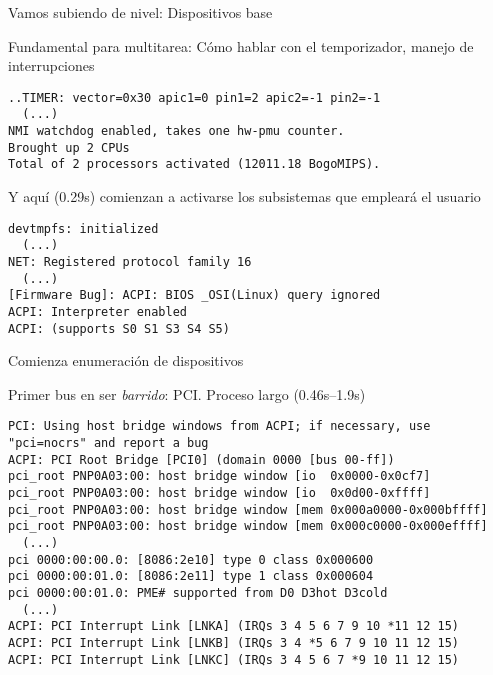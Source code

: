 \documentclass[presentation]{beamer}
\begin{document}
\begin{frame}[label={sec:org59625fe},fragile]{Vamos subiendo de nivel: Dispositivos base}
 \begin{center}
Fundamental para multitarea: Cómo hablar con el temporizador, manejo
de interrupciones
\end{center}
\begin{verbatim}
..TIMER: vector=0x30 apic1=0 pin1=2 apic2=-1 pin2=-1
  (...)
NMI watchdog enabled, takes one hw-pmu counter.
Brought up 2 CPUs
Total of 2 processors activated (12011.18 BogoMIPS).
\end{verbatim}
\begin{center}
Y aquí (0.29s) comienzan a activarse los subsistemas que empleará el
usuario
\end{center}
\begin{verbatim}
devtmpfs: initialized
  (...)
NET: Registered protocol family 16
  (...)
[Firmware Bug]: ACPI: BIOS _OSI(Linux) query ignored
ACPI: Interpreter enabled
ACPI: (supports S0 S1 S3 S4 S5)
\end{verbatim}
\end{frame}

\begin{frame}[label={sec:org52a0d98},fragile]{Comienza enumeración de dispositivos}
 \begin{center}
Primer bus en ser \emph{barrido}: PCI. Proceso largo (0.46s–1.9s)
\end{center}
\begin{verbatim}
PCI: Using host bridge windows from ACPI; if necessary, use "pci=nocrs" and report a bug
ACPI: PCI Root Bridge [PCI0] (domain 0000 [bus 00-ff])
pci_root PNP0A03:00: host bridge window [io  0x0000-0x0cf7]
pci_root PNP0A03:00: host bridge window [io  0x0d00-0xffff]
pci_root PNP0A03:00: host bridge window [mem 0x000a0000-0x000bffff]
pci_root PNP0A03:00: host bridge window [mem 0x000c0000-0x000effff]
  (...)
pci 0000:00:00.0: [8086:2e10] type 0 class 0x000600
pci 0000:00:01.0: [8086:2e11] type 1 class 0x000604
pci 0000:00:01.0: PME# supported from D0 D3hot D3cold
  (...)
ACPI: PCI Interrupt Link [LNKA] (IRQs 3 4 5 6 7 9 10 *11 12 15)
ACPI: PCI Interrupt Link [LNKB] (IRQs 3 4 *5 6 7 9 10 11 12 15)
ACPI: PCI Interrupt Link [LNKC] (IRQs 3 4 5 6 7 *9 10 11 12 15)
\end{verbatim}
\end{frame}
\end{document}
